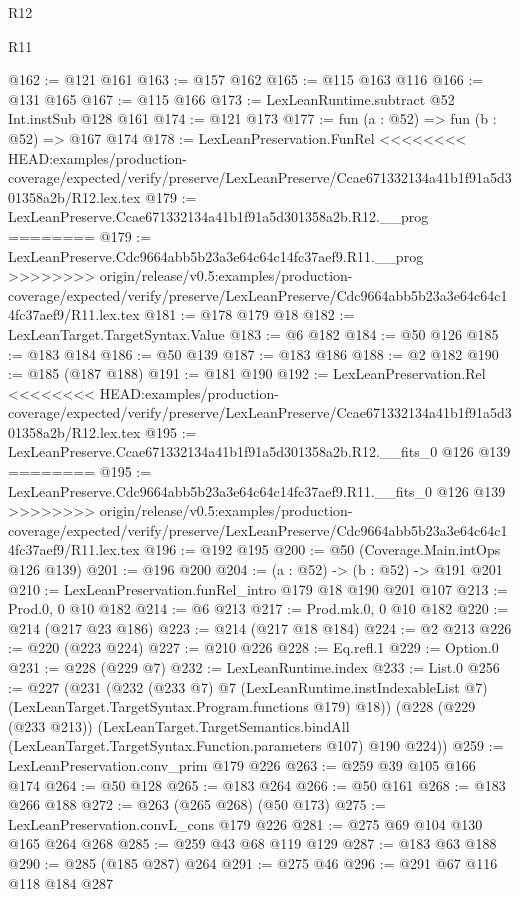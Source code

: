 \begin{lexlean}{R12}
\begin{lexlean}{R11}
\begin{coremodule}
{{{{{@162 := @121 @161
@163 := @157 @162
@165 := @115 @163 @116
@166 := @131 @165
@167 := @115 @166
@173 := LexLeanRuntime.subtract @52 Int.instSub @128 @161
@174 := @121 @173
@177 := fun (a : @52) => fun (b : @52) => @167 @174
@178 := LexLeanPreservation.FunRel
<<<<<<<< HEAD:examples/production-coverage/expected/verify/preserve/LexLeanPreserve/Ccae671332134a41b1f91a5d301358a2b/R12.lex.tex
@179 := LexLeanPreserve.Ccae671332134a41b1f91a5d301358a2b.R12.__prog
========
@179 := LexLeanPreserve.Cdc9664abb5b23a3e64c64c14fc37aef9.R11.__prog
>>>>>>>> origin/release/v0.5:examples/production-coverage/expected/verify/preserve/LexLeanPreserve/Cdc9664abb5b23a3e64c64c14fc37aef9/R11.lex.tex
@181 := @178 @179 @18
@182 := LexLeanTarget.TargetSyntax.Value
@183 := @6 @182
@184 := @50 @126
@185 := @183 @184
@186 := @50 @139
@187 := @183 @186
@188 := @2 @182
@190 := @185 (@187 @188)
@191 := @181 @190
@192 := LexLeanPreservation.Rel
<<<<<<<< HEAD:examples/production-coverage/expected/verify/preserve/LexLeanPreserve/Ccae671332134a41b1f91a5d301358a2b/R12.lex.tex
@195 := LexLeanPreserve.Ccae671332134a41b1f91a5d301358a2b.R12.__fits_0 @126 @139
========
@195 := LexLeanPreserve.Cdc9664abb5b23a3e64c64c14fc37aef9.R11.__fits_0 @126 @139
>>>>>>>> origin/release/v0.5:examples/production-coverage/expected/verify/preserve/LexLeanPreserve/Cdc9664abb5b23a3e64c64c14fc37aef9/R11.lex.tex
@196 := @192 @195
@200 := @50 (Coverage.Main.intOps @126 @139)
@201 := @196 @200
@204 := (a : @52) -> (b : @52) -> @191 @201
@210 := LexLeanPreservation.funRel_intro @179 @18 @190 @201 @107
@213 := Prod.{0, 0} @10 @182
@214 := @6 @213
@217 := Prod.mk.{0, 0} @10 @182
@220 := @214 (@217 @23 @186)
@223 := @214 (@217 @18 @184)
@224 := @2 @213
@226 := @220 (@223 @224)
@227 := @210 @226
@228 := Eq.refl.{1}
@229 := Option.{0}
@231 := @228 (@229 @7)
@232 := LexLeanRuntime.index
@233 := List.{0}
@256 := @227
    (@231
      (@232
        (@233 @7)
        @7
        (LexLeanRuntime.instIndexableList @7)
        (LexLeanTarget.TargetSyntax.Program.functions @179)
        @18))
    (@228
      (@229 (@233 @213))
      (LexLeanTarget.TargetSemantics.bindAll
        (LexLeanTarget.TargetSyntax.Function.parameters @107)
        @190
        @224))
@259 := LexLeanPreservation.conv_prim @179 @226
@263 := @259 @39 @105 @166 @174
@264 := @50 @128
@265 := @183 @264
@266 := @50 @161
@268 := @183 @266 @188
@272 := @263 (@265 @268) (@50 @173)
@275 := LexLeanPreservation.convL_cons @179 @226
@281 := @275 @69 @104 @130 @165 @264 @268
@285 := @259 @43 @68 @119 @129
@287 := @183 @63 @188
@290 := @285 (@185 @287) @264
@291 := @275 @46
@296 := @291 @67 @116 @118 @184 @287
}}}}}
\end{coremodule}
\end{lexlean}
\end{lexlean}
